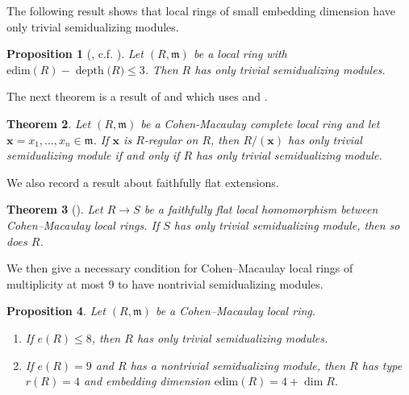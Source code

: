 \documentclass{amsart}
\newcommand{\depth}[1]{\operatorname{depth} {#1}}
\newcommand{\m}{\mathfrak{m}}
\theoremstyle{plain}
\newtheorem{theorem}{Theorem}
\newtheorem{prop}[theorem]{Proposition}
\theoremstyle{definition}
\numberwithin{theorem}{section}
\numberwithin{equation}{section}
\numberwithin{equation}{theorem}
\begin{document}
The following result shows that local rings of small embedding dimension have only trivial semidualizing modules.

\begin{prop}[{\cite{NSW}, c.f. \cite[Proposition 4.10]{LM}}] \label{ecodepth}
Let $(R,\mathfrak{m})$ be a local ring with $\mathrm{edim}(R)-\depth(R)\le 3$.
Then $R$ has only trivial semidualizing modules.
\end{prop}


The next theorem is a result of \cite[Proposition 4.2]{FSW2} and \cite[Fact]{CSW} which uses \cite[Proposition 5.7]{C} and \cite[Theorem 4.5 and Theorem 4.9]{FSW1}.

\begin{theorem}\label{regular}
Let $(R, \m)$ be a Cohen-Macaulay complete local ring and let $\mathbf{x}=x_1, \ldots, x_n \in \m$. If $\mathbf{x}$ is $R$-regular on $R$, then $R/(\mathbf{x})$ has only trivial semidualizing module if and only if $R$ has only trivial semidualizing module. 
\end{theorem}

We also record a result about faithfully flat extensions.

\begin{theorem}[{\cite[Theorem 4.5 and Theorem 4.9]{FSW1}}] \label{fflat}
Let $R \to S$ be a faithfully flat local homomorphism between Cohen--Macaulay local rings.
If $S$ has only trivial semidualizing module, then so does $R$.
\end{theorem}

We then give a necessary condition for Cohen--Macaulay local rings of multiplicity at most $9$ to have nontrivial semidualizing modules.

\begin{prop} \label{mult8}
Let $(R,\mathfrak{m})$ be a Cohen--Macaulay local ring.
\begin{enumerate}[ \rm(1)]
\item If $e(R) \le 8$, then $R$ has only trivial semidualizing modules.
\item If $e(R)=9$ and $R$ has a nontrivial semidualizing module, then $R$ has type $r(R)=4$ and embedding dimension $\mathrm{edim}(R)=4+\dim R$.
\end{enumerate}
\end{prop}
\end{document}
